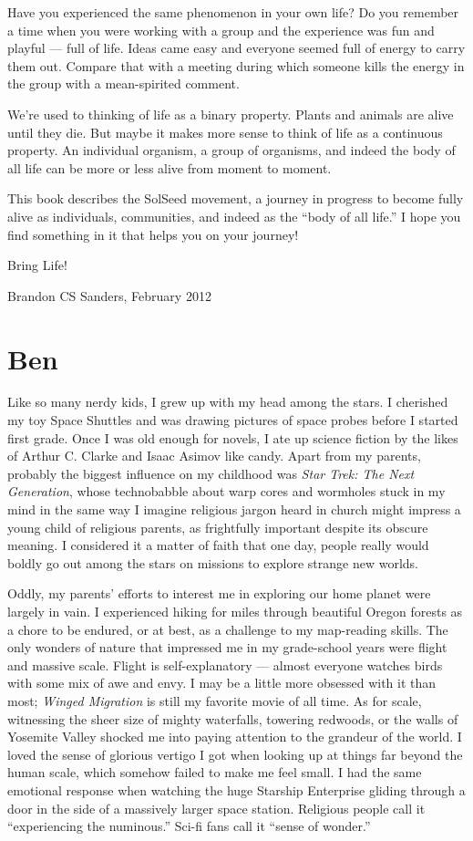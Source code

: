 \documentclass[ebook,12pt,openany,twoside]{memoir}
\begin{document}
Have you experienced the same phenomenon in your own life? Do you remember a
time when you were working with a group and the experience was fun and playful
--- full of life. Ideas came easy and everyone seemed full of energy to carry
them out. Compare that with a meeting during which someone kills the energy in
the group with a mean-spirited comment.

We're used to thinking of life as a binary property. Plants and animals are
alive until they die. But maybe it makes more sense to think of life as a
continuous property. An individual organism, a group of organisms, and indeed
the body of all life can be more or less alive from moment to moment.

This book describes the SolSeed movement, a journey in progress to become fully
alive as individuals, communities, and indeed as the ``body of all life.'' I
hope you find something in it that helps you on your journey!

Bring Life!

Brandon CS Sanders, February 2012

\chapter*{Ben}

Like so many nerdy kids, I grew up with my head among the stars.  I cherished my toy Space Shuttles and was drawing pictures of space probes before I started first grade.  Once I was old enough for novels, I ate up science fiction by the likes of Arthur C. Clarke and Isaac Asimov like candy.  Apart from my parents, probably the biggest influence on my childhood was {\em Star Trek: The Next Generation}, whose technobabble about warp cores and wormholes stuck in my mind in the same way I imagine religious jargon heard in church might impress a young child of religious parents, as frightfully important despite its obscure meaning.  I considered it a matter of faith that one day, people really would boldly go out among the stars on missions to explore strange new worlds.

Oddly, my parents' efforts to interest me in exploring our home planet were largely in vain.  I experienced hiking for miles through beautiful Oregon forests as a chore to be endured, or at best, as a challenge to my map-reading skills.  The only wonders of nature that impressed me in my grade-school years were flight and massive scale.  Flight is self-explanatory --- almost everyone watches birds with some mix of awe and envy.  I may be a little more obsessed with it than most; {\em Winged Migration} is still my favorite movie of all time.  As for scale, witnessing the sheer size of mighty waterfalls, towering redwoods, or the walls of Yosemite Valley shocked me into paying attention to the grandeur of the world.  I loved the sense of glorious vertigo I got when looking up at things far beyond the human scale, which somehow failed to make me feel small.  I had the same emotional response when watching the huge Starship Enterprise gliding through a door in the side of a massively larger space station.  Religious people call it ``experiencing the numinous.'' Sci-fi fans call it ``sense of wonder.''
\end{document}
